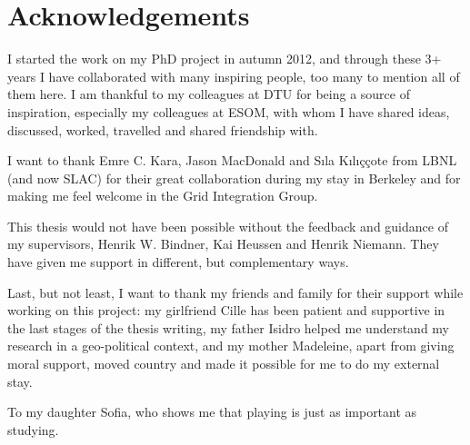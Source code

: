\chapter{Acknowledgements}
I started the work on my PhD project in autumn 2012, and through these 3+ years I have collaborated with many inspiring people, too many to mention all of them here. I am thankful to my colleagues at DTU for being a source of inspiration, especially my colleagues at ESOM, with whom I have shared ideas, discussed, worked, travelled and shared friendship with.

I want to thank Emre C. Kara, Jason MacDonald and S{\i}la K{\i}l{\i}\c{c}\c{c}ote from LBNL (and now SLAC) for their great collaboration during my stay in Berkeley and for making me feel welcome in the Grid Integration Group. %

This thesis would not have been possible without the feedback and guidance of my supervisors, Henrik W. Bindner, Kai Heussen and Henrik Niemann. They have given me support in different, but complementary ways.

Last, but not least, I want to thank my friends and family for their support while working on this project: my girlfriend Cille has been patient and supportive in the last stages of the thesis writing, my father Isidro helped me understand my research in a geo-political context, and my mother Madeleine, apart from giving moral support, moved country and made it possible for me to do my external stay.

To my daughter Sofia, who shows me that playing is just as important as studying.
%
%
%
